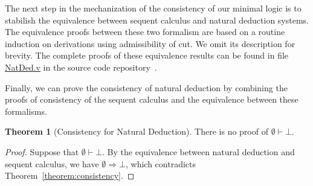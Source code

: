 \documentclass[12pt]{article}
\theoremstyle{definition}
\newtheorem{Theorem}{Theorem}
\begin{document}
The next step in the mechanization of the
consistency of our minimal logic is to stabilish the equivalence between sequent
calculus and natural deduction systems. The equivalence proofs between these two
formalism are based on a routine induction on derivations using admissibility of
cut. We omit its description for brevity. The complete proofs of these
equivalence results can be found in file
\href{https://github.com/rodrigogribeiro/consistency-coq/blob/master/Minimal/NatDed.v}{NatDed.v} in the source code
repository~\cite{Sasdelli20}.

Finally, we can prove the consistency of natural deduction by combining the
proofs of consistency of the sequent calculus and the equivalence between these
formalisms.

\begin{Theorem}[Consistency for Natural Deduction]
  There is no proof of $\emptyset \vdash \bot$.
\end{Theorem}
\begin{proof}
  Suppose that $\emptyset \vdash \bot$. By the equivalence between natural
  deduction and sequent calculus, we have $\emptyset\Rightarrow \bot$, which
  contradicts Theorem~\ref{theorem:consistency}.
\end{proof}  
\end{document}
